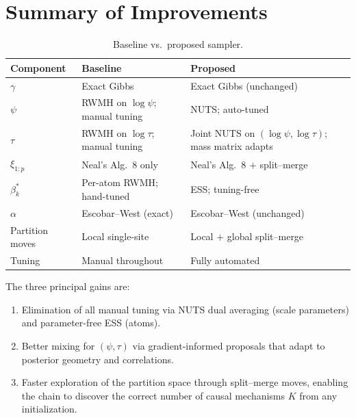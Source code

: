 \documentclass[12pt, a4paper]{article}
\theoremstyle{remark}
\begin{document}
\section{Summary of Improvements}

\begin{table}[h!]
\centering
\small
\caption{Baseline vs.\ proposed sampler.}
\label{tab:compare}
\begin{tabular}{@{}p{3.2cm}p{5.2cm}p{5.2cm}@{}}
\toprule
Component & Baseline & Proposed \\
\midrule
$\gamma$ & Exact Gibbs & Exact Gibbs (unchanged) \\[2pt]
$\psi$ & RWMH on $\log\psi$; manual tuning & NUTS; auto-tuned \\[2pt]
$\tau$ & RWMH on $\log\tau$; manual tuning & Joint NUTS on $(\log\psi,\log\tau)$;
  mass matrix adapts \\[2pt]
$\xi_{1:p}$ & Neal's Alg.~8 only & Neal's Alg.~8 $+$ split--merge \\[2pt]
$\beta_k^*$ & Per-atom RWMH; hand-tuned & ESS; tuning-free \\[2pt]
$\alpha$ & Escobar--West (exact) & Escobar--West (unchanged) \\[2pt]
Partition moves & Local single-site & Local $+$ global split--merge \\[2pt]
Tuning & Manual throughout & Fully automated \\
\bottomrule
\end{tabular}
\end{table}

The three principal gains are:
\begin{enumerate}[leftmargin=*, itemsep=3pt]
  \item Elimination of all manual tuning via NUTS dual averaging
        (scale parameters) and parameter-free ESS (atoms).
  \item Better mixing for $(\psi,\tau)$ via gradient-informed
        proposals that adapt to posterior geometry and correlations.
  \item Faster exploration of the partition space through split--merge
        moves, enabling the chain to discover the correct number of
        causal mechanisms $K$ from any initialization.
\end{enumerate}

\appendix
\end{document}
